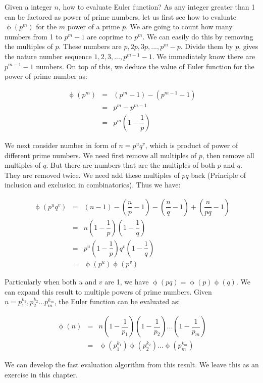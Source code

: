 \documentclass{article}
\begin{document}
Given a integer $n$, how to evaluate Euler function? As any integer greater than 1 can be factored as power of prime numbers, let us first see how to evaluate $\upphi(p^m)$ for the $m$ power of a prime $p$. We are going to count how many numbers from 1 to $p^m - 1$ are coprime to $p^m$. We can easily do this by removing the multiples of $p$. These numbers are $p, 2p, 3p, ..., p^m - p$. Divide them by $p$, gives the nature number sequence $1, 2, 3, ..., p^{m-1} - 1$. We immediately know there are $p^{m-1} - 1$ numbers. On top of this, we deduce the value of Euler function for the power of prime number as:

\[
\begin{array}{rcl}
\upphi(p^m) & = & (p^m - 1) - (p^{m-1} - 1) \\
            & = & p^m - p^{m-1} \\
            & = & p^m(1-\dfrac{1}{p})
\end{array}
\]

We next consider number in form of $n = p^uq^v$, which is product of power of different prime numbers. We need first remove all multiples of $p$, then remove all multiples of $q$. But there are numbers that are the multiples of both $p$ and $q$. They are removed twice. We need add these multiples of $pq$ back (Principle of inclusion and exclusion in combinatorics). Thus we have:

\[
\begin{array}{rcl}
\upphi(p^uq^v) & = & (n - 1) - (\dfrac{n}{p} - 1) - (\dfrac{n}{q} - 1) + (\dfrac{n}{pq} - 1) \\
          & = & n(1 - \dfrac{1}{p})(1 - \dfrac{1}{q}) \\
          & = & p^u(1 - \dfrac{1}{p})q^v(1 - \dfrac{1}{q}) \\
          & = & \upphi(p^u)\upphi(p^v)
\end{array}
\]

Particularly when both $u$ and $v$ are 1, we have $\upphi(pq) = \upphi(p)\upphi(q)$. We can expand this result to multiple powers of prime numbers. Given $n = p_1^{k_1}, p_2^{k_2}...p_m^{k_m}$, the Euler function can be evaluated as:

\[
\begin{array}{rcl}
\upphi(n) & = & n(1-\dfrac{1}{p_1})(1-\dfrac{1}{p_2})...(1-\dfrac{1}{p_m}) \\
    & = & \upphi(p_1^{k_1})\upphi(p_2^{k_2})...\upphi(p_m^{k_m})
\end{array}
\]

We can develop the fast evaluation algorithm from this result. We leave this as an exercise in this chapter.
\end{document}
